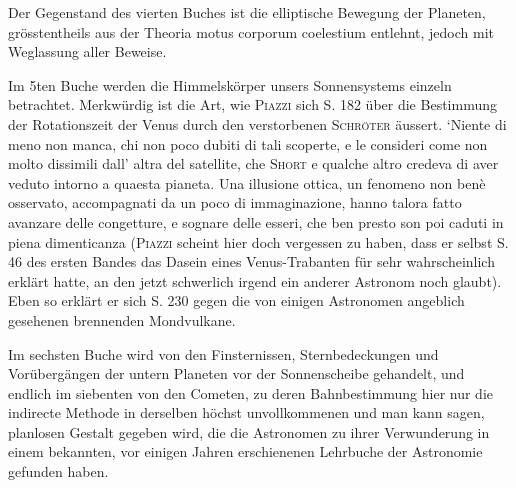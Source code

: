 Der Gegenstand des vierten Buches ist die elliptische Bewegung der Planeten, grösstentheils aus der Theoria motus corporum coelestium entlehnt, jedoch mit Weglassung aller Beweise.

Im 5ten Buche werden die Himmelskörper unsers Sonnensystems einzeln betrachtet. Merkwürdig ist die Art, wie \textsc{Piazzi} sich S. 182 über die Bestimmung der Rotationszeit der Venus durch den verstorbenen \textsc{Schröter} äussert. `Niente di meno non manca, chi non poco dubiti di tali scoperte, e le consideri come non molto dissimili dall' altra del satellite, che \textsc{Short} e qualche altro credeva di aver veduto intorno a quaesta pianeta. Una illusione ottica, un fenomeno non benè osservato, accompagnati da un poco di immaginazione, hanno talora fatto avanzare delle congetture, e sognare delle esseri, che ben presto son poi caduti in piena dimenticanza (\textsc{Piazzi} scheint hier doch vergessen zu haben, dass er selbst S. 46 des ersten Bandes das Dasein eines Venus-Trabanten für sehr wahrscheinlich erklärt hatte, an den jetzt schwerlich irgend ein anderer Astronom noch glaubt). Eben so erklärt er sich S. 230 gegen die von einigen Astronomen angeblich gesehenen brennenden Mondvulkane.

Im sechsten Buche wird von den Finsternissen, Sternbedeckungen und Vorübergängen der untern Planeten vor der Sonnenscheibe gehandelt, und endlich im siebenten von den Cometen, zu deren Bahnbestimmung hier nur die indirecte Methode in derselben höchst unvollkommenen und man kann sagen, planlosen Gestalt gegeben wird, die die Astronomen zu ihrer Verwunderung in einem bekannten, vor einigen Jahren erschienenen Lehrbuche der Astronomie gefunden haben.
